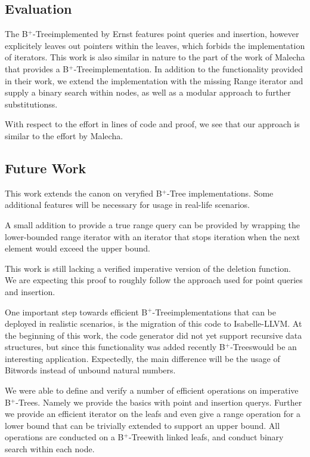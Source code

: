 \documentclass[a4paper,UKenglish,cleveref, autoref, thm-restate]{lipics-v2021}
\newcommand{\btree}{B$^+$-Tree}
\newcommand{\btrees}{B$^+$-Trees}
\begin{document}
\subsection{Evaluation}


The \btree implemented by Ernst features point queries and insertion,
however explicitely leaves out pointers within the leaves,
which forbids the implementation of iterators.
This work is also similar in nature to the part of the work of Malecha
that provides a \btree implementation.
In addition to the functionality provided in their work, we extend
the implementation with the missing Range iterator
and supply a binary search within nodes, as well as a modular approach
to further substitutionss.

With respect to the effort in lines of code and proof, we see
that our approach is similar to the effort by Malecha.

\subsection{Future Work}

This work extends the canon on veryfied \btree
implementations.
Some additional features will be necessary for
usage in real-life scenarios.

A small addition to provide a true
range query can be provided by wrapping the lower-bounded
range iterator with an iterator
that stops iteration when the next element
would exceed the upper bound.

This work is still lacking a verified imperative version
of the deletion function.
We are expecting this proof to roughly follow
the approach used for point queries and insertion.

One important step towards efficient
\btree implementations that can be deployed
in realistic scenarios, is the migration of this code
to Isabelle-LLVM. %
At the beginning of this work, the code generator did
not yet support recursive data structures, but since
this functionality was added recently \btrees would be an interesting application.
Expectedly, the main difference will be the usage of Bitwords
instead of unbound natural numbers.


We were able to define and verify a number of efficient operations
on imperative \btrees.
Namely we provide the basics with point and insertion querys.
Further we provide an efficient iterator on the leafs
and even give a range operation for a lower bound that
can be trivially extended to support an upper bound.
All operations are conducted on a \btree with linked leafs,
and conduct binary search within each node.
\end{document}
